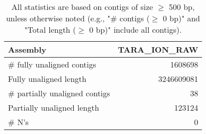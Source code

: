 \documentclass[12pt,a4paper]{article}
\begin{document}
\begin{table}[ht]
\begin{center}
\caption{All statistics are based on contigs of size $\geq$ 500 bp, unless otherwise noted (e.g., "\# contigs ($\geq$ 0 bp)" and "Total length ($\geq$ 0 bp)" include all contigs).}
\begin{tabular}{|l*{1}{|r}|}
\hline
Assembly & TARA\_ION\_RAW \\ \hline
\# fully unaligned contigs & 1608698 \\ \hline
Fully unaligned length & 3246609081 \\ \hline
\# partially unaligned contigs & 38 \\ \hline
Partially unaligned length & 123124 \\ \hline
\# N's & 0 \\ \hline
\end{tabular}
\end{center}
\end{table}
\end{document}
